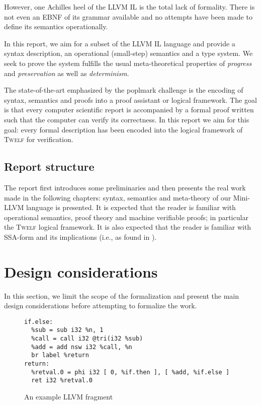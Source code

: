 \documentclass[a4paper, oneside, 10pt, draft]{memoir}
\newcommand{\twelf}{\textsc{Twelf}}
\begin{document}
However, one Achilles heel of the LLVM IL is the total lack of
formality. There is not even an EBNF of its grammar available and no
attempts have been made to define its semantics operationally.

In this report, we aim for a subset of the LLVM IL language and
provide a syntax description, an operational (small-step) semantics and a type
system. We seek to prove the system fulfills the usual meta-theoretical
properties of \emph{progress} and \emph{preservation} as well as
\emph{determinism}.

The state-of-the-art emphasized by the poplmark
challenge\cite{aydemir:2005:mechanizedmetatheory} is the encoding of
syntax, semantics and proofs into a proof assistant or logical
framework. The goal is that every computer scientific report is
accompanied by a formal proof written such that the computer can
verify its correctness. In this report we aim for this goal: every
formal description has been encoded into the logical framework of
\twelf{}\cite{schurmann.pfenning:twelf} for verification.

\section{Report structure}

The report first introduces some preliminaries and then presents the
real work made in the following chapters: syntax, semantics and
meta-theory of our Mini-LLVM language is presented. It is expected
that the reader is familiar with operational semantics, proof theory
and machine verifiable proofs; in particular the \twelf{} logical
framework. It is also expected that the reader is familiar with
SSA-form and its implications (i.e., as found in
\cite[Chapter 19]{appel:1998:modern}).

\chapter{Design considerations}

In this section, we limit the scope of the formalization and present
the main design considerations before attempting to formalize the work.

\begin{figure}
\begin{verbatim}
if.else:
  %sub = sub i32 %n, 1
  %call = call i32 @tri(i32 %sub)
  %add = add nsw i32 %call, %n
  br label %return
return:
  %retval.0 = phi i32 [ 0, %if.then ], [ %add, %if.else ]
  ret i32 %retval.0

\end{verbatim}
  \caption{An example LLVM fragment}
  \label{fig:llvm-example-1}
\end{figure}
\end{document}
